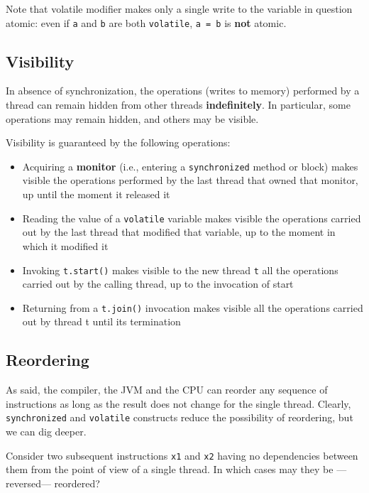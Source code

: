 Note that volatile modifier makes only a single write to
the variable in question atomic:
even if \lstinline|a| and \lstinline|b| are both \lstinline|volatile|, \lstinline|a = b| is \textbf{not} atomic.

\subsection{Visibility}
In absence of synchronization, the operations (writes to memory)
performed by a thread can remain hidden from other threads \textbf{indefinitely}.
In particular, some operations may remain hidden, and others may be
visible.

{Visibility is guaranteed by the following operations:\ns
\begin{itemize}
   \item Acquiring a \textbf{monitor} (i.e., entering a \lstinline|synchronized| method or block) makes visible the operations performed by the last thread that owned that monitor, up until the moment it released it
   \item Reading the value of a \lstinline|volatile| variable makes visible the operations carried out by the last thread that modified that variable, up to the moment in which it modified it
   \item Invoking \lstinline|t.start()| makes visible to the new thread \lstinline|t| all the operations carried out by the calling thread, up to the invocation of start
   \item Returning from a \lstinline|t.join()| invocation makes visible all the operations carried out by thread t until its termination 
\end{itemize}
}

\subsection{Reordering}
As said, the compiler, the JVM and the CPU can reorder any
sequence of instructions as long as the result does not change for
the single thread.
Clearly, \lstinline|synchronized| and \lstinline|volatile| constructs reduce the possibility of reordering, but we can dig deeper.

Consider two subsequent instructions \lstinline|x1| and \lstinline|x2| having no dependencies between them from the point of view of a single thread.
In which cases may they be ---reversed--- reordered?

